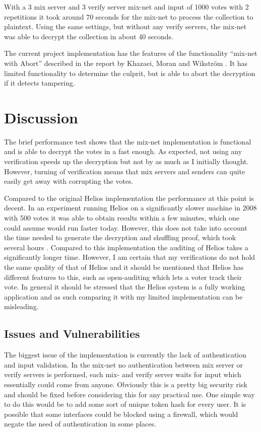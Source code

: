 \documentclass[a4paper,11pt]{kth-mag}
\begin{document}
With a 3 mix server and 3 verify server mix-net and input of 1000 votes with 2 repetitions it took around 70 seconds for the mix-net to process the collection to plaintext. Using the same settings, but without any verify servers, the mix-net was able to decrypt the collection in about 40 seconds.

The current project implementation has the features of the functionality “mix-net with Abort” described in the report by Khazaei, Moran and Wikström \cite{4}. It has limited functionality to determine the culprit, but is able to abort the decryption if it detects tampering.

\chapter{Discussion}
The brief performance test shows that the mix-net implementation is functional and is able to decrypt the votes in a fast enough. As expected, not using any verification speeds up the decryption but not by as much as I initially thought. However, turning of verification means that mix servers and senders can quite easily get away with corrupting the votes.

Compared to the original Helios implementation the performance at this point is decent. In an experiment running Helios on a significantly slower machine in 2008 with 500 votes it was able to obtain results within a few minutes, which one could assume would run faster today. However, this does not take into account the time needed to generate the decryption and shuffling proof, which took several hours \cite{10}. Compared to this implementation the auditing of Helios takes a significantly longer time. However, I am certain that my verifications do not hold the same quality of that of Helios and it should be mentioned that Helios has different features to this, such as open-auditing which lets a voter track their vote. In general it should be stressed that the Helios system is a fully working application and as such comparing it with my limited implementation can be misleading.
\section{Issues and Vulnerabilities}
The biggest issue of the implementation is currently the lack of authentication and input validation. In the mix-net no authentication between mix server or verify servers is performed, each mix- and verify server waits for input which essentially could come from anyone. Obviously this is a pretty big security risk and should be fixed before considering this for any practical use. One simple way to do this would be to add some sort of unique token hash for every user. It is possible that some interfaces could be blocked using a firewall, which would negate the need of authentication in some places. 
\end{document}
